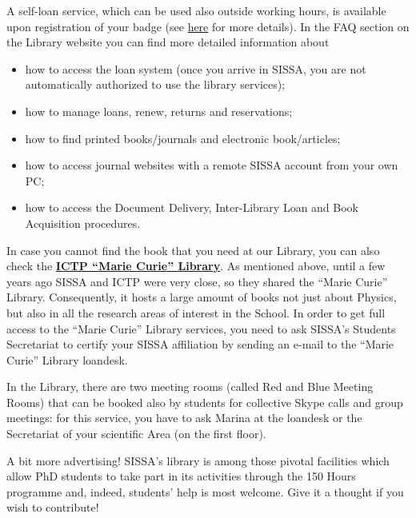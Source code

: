 \documentclass{sissavademecum}
\begin{document}
A self-loan service, which can be used also outside working hours, is available upon registration of your badge (see \hyperlink{Badge}{here} for more details). In the FAQ section on the Library website you can find more detailed information about
\begin{itemize}
    \item how to access the loan system (once you arrive in SISSA, you are not automatically authorized to use the library services);
    \item how to manage loans, renew, returns and reservations;
    \item how to find printed books/journals and electronic book/articles;
    \item how to access journal websites with a remote SISSA account from your own PC;
    \item how to access the Document Delivery, Inter-Library Loan and Book Acquisition procedures.
\end{itemize}

In case you cannot find the book that you need at our Library, you can also check the \href{http://library.ictp.it/}{\textbf{ICTP ``Marie Curie'' Library}}. As mentioned above, until a few years ago SISSA and ICTP were very close, so they shared the ``Marie Curie'' Library. Consequently, it hosts a large amount of books not just about Physics, but also in all the research areas of interest in the School. In order to get full access to the ``Marie Curie'' Library services, you need to ask SISSA's Students Secretariat to certify your SISSA affiliation by sending an e-mail to the ``Marie Curie'' Library loandesk.

In the Library, there are two meeting rooms (called Red and Blue Meeting Rooms) that can be booked also by students for collective Skype calls and group meetings: for this service, you have to ask Marina at the loandesk or the Secretariat of your scientific Area (on the first floor).

A bit more advertising! SISSA's library is among those pivotal facilities which allow PhD students to take part in its activities through the 150 Hours programme and, indeed, students' help is most welcome. Give it a thought if you wish to contribute!
\end{document}

